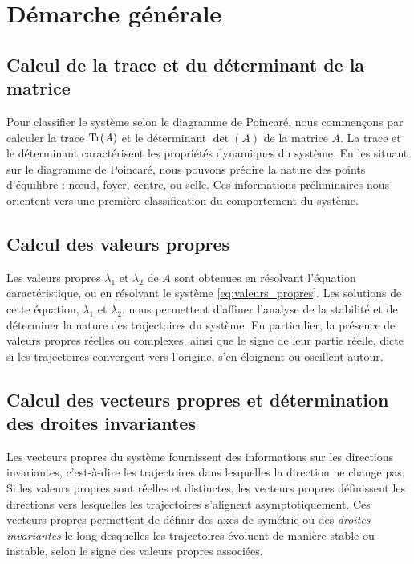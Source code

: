     \section{Démarche générale}
        \subsection{Calcul de la trace et du déterminant de la matrice}
        Pour classifier le système selon le diagramme de Poincaré, nous commençons par calculer la trace $\operatorname{Tr}(A)$ et le déterminant $\det(A)$ de la matrice $A$. La trace et le déterminant caractérisent les propriétés dynamiques du système. En les situant sur le diagramme de Poincaré, nous pouvons prédire la nature des points d'équilibre : nœud, foyer, centre, ou selle. Ces informations préliminaires nous orientent vers une première classification du comportement du système.

        \subsection{Calcul des valeurs propres}
            Les valeurs propres $\lambda_1$ et $\lambda_2$ de $A$ sont obtenues en résolvant l'équation caractéristique, ou en résolvant le système \ref{eq:valeurs_propres}. Les solutions de cette équation, $\lambda_1$ et $\lambda_2$, nous permettent d'affiner l’analyse de la stabilité et de déterminer la nature des trajectoires du système. En particulier, la présence de valeurs propres réelles ou complexes, ainsi que le signe de leur partie réelle, dicte si les trajectoires convergent vers l’origine, s’en éloignent ou oscillent autour.
            
        \subsection{Calcul des vecteurs propres et détermination des droites invariantes}
            Les vecteurs propres du système fournissent des informations sur les directions invariantes, c'est-à-dire les trajectoires dans lesquelles la direction ne change pas. Si les valeurs propres sont réelles et distinctes, les vecteurs propres définissent les directions vers lesquelles les trajectoires s’alignent asymptotiquement.
            Ces vecteurs propres permettent de définir des axes de symétrie ou des \textit{droites invariantes} le long desquelles les trajectoires évoluent de manière stable ou instable, selon le signe des valeurs propres associées.

